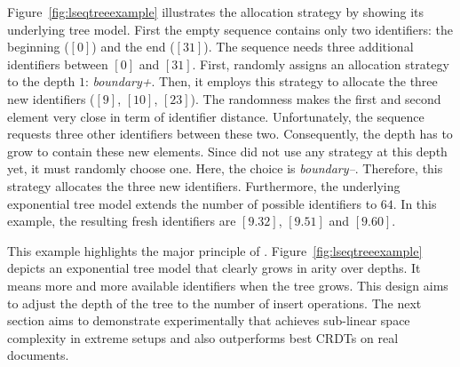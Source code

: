Figure~\ref{fig:lseqtreeexample} illustrates the allocation strategy \NAME{} by
showing its underlying tree model. First the empty sequence contains only two
identifiers: the beginning ($[0]$) and the end ($[31]$). The sequence needs
three additional identifiers between $[0]$ and $[31]$. First, \NAME{} randomly
assigns an allocation strategy to the depth $1$: \emph{boundary+}. Then, it
employs this strategy to allocate the three new identifiers ($[9]$, $[10]$,
$[23]$). The randomness makes the first and second element very close in term
of identifier distance.  Unfortunately, the sequence requests three other
identifiers between these two. Consequently, the depth has to grow to contain
these new elements. Since \NAME{} did not use any strategy at this depth yet,
it must randomly choose one. Here, the choice is \emph{boundary--}. Therefore,
this strategy allocates the three new identifiers. Furthermore, the underlying
exponential tree model extends the number of possible identifiers to $64$. In
this example, the resulting fresh identifiers are $[9.32]$, $[9.51]$ and
$[9.60]$.



This example highlights the major principle of \NAME{}.
Figure~\ref{fig:lseqtreeexample} depicts an exponential tree model that clearly
grows in arity over depths. It means more and more available identifiers when
the tree grows. This design aims to adjust the depth of the tree to the number
of insert operations. The next section aims to demonstrate experimentally that
\NAME{} achieves sub-linear space complexity in extreme setups and also
outperforms best CRDTs on real documents.

